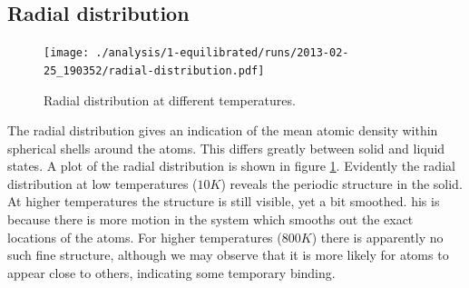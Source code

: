 \documentclass[reprint,floatfix,amsmath,amssymb,aps,pra]{revtex4-1}
\begin{document}
\subsection{Radial distribution}

\begin{figure}
    \centering
    \texttt{[image: ./analysis/1-equilibrated/runs/2013-02-25\_190352/radial-distribution.pdf]}
    \caption{Radial distribution at different temperatures.}
    \label{fig:radial-distribution}
\end{figure}

The radial distribution gives an indication of the mean atomic density within spherical shells around the atoms.
This differs greatly between solid and liquid states. 
A plot of the radial distribution is shown in figure \ref{fig:radial-distribution}. Evidently the radial distribution at low temperatures ($10 \unit{K}$) reveals the periodic structure in the solid. At higher temperatures the structure is still visible, yet a bit smoothed. 
his is because there is more motion in the system which smooths out the exact locations of the atoms. 
For higher temperatures ($800 \unit{K}$) there is apparently no such fine structure, although we may observe that it is more likely for atoms to appear close to others, indicating some temporary binding.




\appendix





\end{document}
